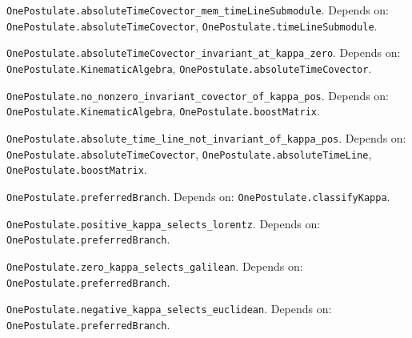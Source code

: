 \begin{lemma}\label{OnePostulate.absoluteTimeCovector_mem_timeLineSubmodule}
\texttt{OnePostulate.absoluteTimeCovector\_mem\_timeLineSubmodule}. Depends on: \texttt{OnePostulate.absoluteTimeCovector}, \texttt{OnePostulate.timeLineSubmodule}.
\end{lemma}

\begin{lemma}\label{OnePostulate.absoluteTimeCovector_invariant_at_kappa_zero}
\texttt{OnePostulate.absoluteTimeCovector\_invariant\_at\_kappa\_zero}. Depends on: \texttt{OnePostulate.KinematicAlgebra}, \texttt{OnePostulate.absoluteTimeCovector}.
\end{lemma}

\begin{lemma}\label{OnePostulate.no_nonzero_invariant_covector_of_kappa_pos}
\texttt{OnePostulate.no\_nonzero\_invariant\_covector\_of\_kappa\_pos}. Depends on: \texttt{OnePostulate.KinematicAlgebra}, \texttt{OnePostulate.boostMatrix}.
\end{lemma}

\begin{lemma}\label{OnePostulate.absolute_time_line_not_invariant_of_kappa_pos}
\texttt{OnePostulate.absolute\_time\_line\_not\_invariant\_of\_kappa\_pos}. Depends on: \texttt{OnePostulate.absoluteTimeCovector}, \texttt{OnePostulate.absoluteTimeLine}, \texttt{OnePostulate.boostMatrix}.
\end{lemma}

\begin{definition}\label{OnePostulate.preferredBranch}
\texttt{OnePostulate.preferredBranch}. Depends on: \texttt{OnePostulate.classifyKappa}.
\end{definition}

\begin{lemma}\label{OnePostulate.positive_kappa_selects_lorentz}
\texttt{OnePostulate.positive\_kappa\_selects\_lorentz}. Depends on: \texttt{OnePostulate.preferredBranch}.
\end{lemma}

\begin{lemma}\label{OnePostulate.zero_kappa_selects_galilean}
\texttt{OnePostulate.zero\_kappa\_selects\_galilean}. Depends on: \texttt{OnePostulate.preferredBranch}.
\end{lemma}

\begin{lemma}\label{OnePostulate.negative_kappa_selects_euclidean}
\texttt{OnePostulate.negative\_kappa\_selects\_euclidean}. Depends on: \texttt{OnePostulate.preferredBranch}.
\end{lemma}

